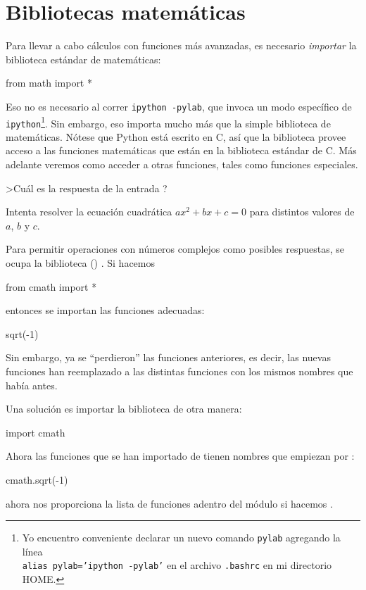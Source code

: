 \section{Bibliotecas matemáticas}
Para llevar a cabo cálculos con funciones más avanzadas, es necesario \emph{importar} la biblioteca estándar de matemáticas:
\begin{python}
from math import *
\end{python}
Eso no es necesario al correr \texttt{ipython -pylab}, que invoca un modo específico de \texttt{ipython}\footnote{Yo encuentro conveniente declarar un nuevo comando \texttt{pylab} agregando la línea \\ \texttt{alias pylab='ipython -pylab'} en el archivo \texttt{.bashrc} en mi directorio HOME.}.
Sin embargo, eso importa mucho más que la simple biblioteca de matemáticas.  Nótese que Python está escrito en C, así que la biblioteca  provee acceso a las funciones matemáticas que están en la biblioteca estándar de C. Más adelante veremos como acceder a otras funciones, tales como funciones especiales.

\ej >Cuál es la respuesta de la entrada ?

\ej Intenta resolver la ecuación cuadrática $a x^2 + b x + c = 0$ para distintos valores de $a$, $b$ y $c$. 



Para permitir operaciones con números complejos como posibles respuestas, se ocupa la biblioteca () .
Si hacemos
\begin{python}
from cmath import *
\end{python}
entonces se importan las funciones adecuadas:
\begin{python}
sqrt(-1)
\end{python}
Sin embargo, ya se ``perdieron'' las funciones anteriores, es decir, las nuevas funciones han reemplazado a las distintas funciones con los mismos nombres que había antes.

Una solución es importar la biblioteca de otra manera:
\begin{python}
import cmath
\end{python}
Ahora las funciones que se han importado de  tienen nombres que empiezan por :
\begin{python}
cmath.sqrt(-1)
\end{python}
 ahora nos proporciona la lista de funciones adentro del módulo si hacemos .






